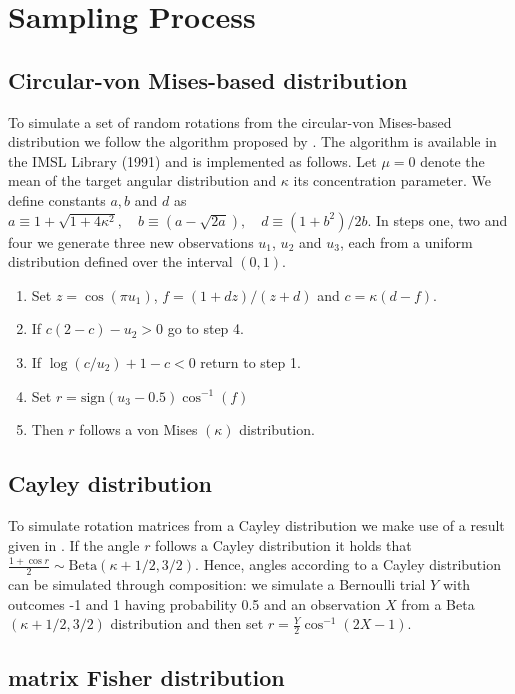 \appendix

\section{Sampling Process}
\label{sec:appendix1}
\subsection{Circular-von Mises-based distribution}

To simulate a set of random rotations from the circular-von Mises-based distribution we follow the  algorithm proposed by \citet{best79}.  The algorithm is available in the IMSL Library (1991) and is implemented as follows.  Let $\mu=0$ denote the mean of the target angular distribution and $\kappa$ its concentration parameter.  We define constants $a, b$ and $d$ as
$a\equiv 1+\sqrt{1+4\kappa^2},\quad b\equiv(a-\sqrt{2a}),\quad d\equiv(1+b^2)/2b.$
In steps one, two and four we generate three new observations $u_1$, $u_2$ and $u_3$,  each from a uniform distribution defined over the interval $(0,1)$. 
\begin{enumerate}
\item Set $z=\cos(\pi u_1)$, $f=(1+dz)/(z+d)$ and $c=\kappa(d-f)$.
\item If $c(2-c)-u_2>0$ go to step 4.
\item If $\log(c/u_2)+1-c<0$ return to step 1.
\item Set $r=\text{sign}(u_3-0.5)\cos^{-1}(f)$
\item Then $r$ follows a von Mises $(\kappa)$ distribution.
\end{enumerate}

\subsection{Cayley distribution}\hfill

To simulate rotation matrices from a Cayley distribution we make use of a result given in \citet{leon06}. If the angle $r$ follows a Cayley distribution it holds that $\frac{1+\cos r}{2} \sim \text{Beta}(\kappa+1/2, 3/2)$.  Hence, angles according to a Cayley distribution can be simulated through composition: we simulate a Bernoulli trial $Y$ with outcomes -1 and 1 having probability 0.5 and an observation $X$ from a Beta$(\kappa+1/2, 3/2)$ distribution and then set $r= \frac{Y}{2}\cos^{-1}(2X-1)$. 

\subsection{matrix Fisher distribution}\hfill

